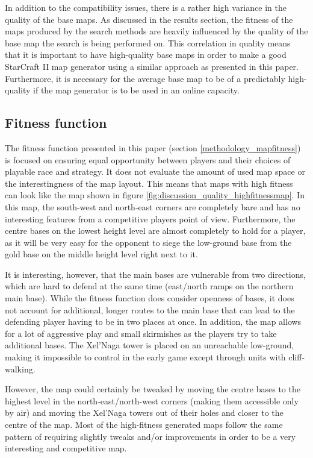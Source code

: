 In addition to the compatibility issues, there is a rather high variance in the quality of the base maps. As discussed in the results section, the fitness of the maps produced by the search methods are heavily influenced by the quality of the base map the search is being performed on. This correlation in quality means that it is important to have high-quality base maps in order to make a good StarCraft II map generator using a similar approach as presented in this paper. Furthermore, it is necessary for the average base map to be of a predictably high-quality if the map generator is to be used in an online capacity. 

\subsection{Fitness function}
\label{discussion_quality_fitnessfunction}
The fitness function presented in this paper (section \ref{methodology_mapfitness}) is focused on ensuring equal opportunity between players and their choices of playable race and strategy. It does not evaluate the amount of used map space or the interestingness of the map layout. This means that maps with high fitness can look like the map shown in figure \ref{fig:discussion_quality_highfitnessmap}. In this map, the south-west and north-east corners are completely bare and has no interesting features from a competitive players point of view. Furthermore, the centre bases on the lowest height level are almost completely to hold for a player, as it will be very easy for the opponent to siege the low-ground base from the gold base on the middle height level right next to it.

It is interesting, however, that the main bases are vulnerable from two directions, which are hard to defend at the same time (east/north ramps on the northern main base). While the fitness function does consider openness of bases, it does not account for additional, longer routes to the main base that can lead to the defending player having to be in two places at once. In addition, the map allows for a lot of aggressive play and small skirmishes as the players try to take additional bases. The Xel'Naga tower is placed on an unreachable low-ground, making it impossible to control in the early game except through units with cliff-walking.

However, the map could certainly be tweaked by moving the centre bases to the highest level in the north-east/north-west corners (making them accessible only by air) and moving the Xel'Naga towers out of their holes and closer to the centre of the map. Most of the high-fitness generated maps follow the same pattern of requiring slightly tweaks and/or improvements in order to be a very interesting and competitive map.

